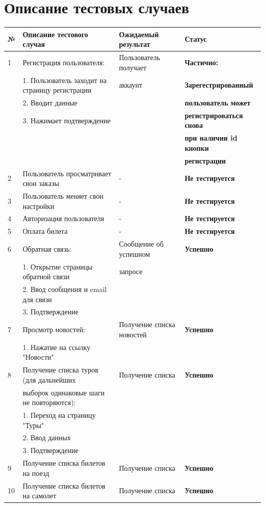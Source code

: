 ﻿\documentclass[article]{article}
\begin{document}
\section*{Описание тестовых случаев}
\begin{tabular}{l|l|l|l}
\hline
	№ & Описание тестового случая & Ожидаемый результат & Статус\\
\hline
	1 & Регистрация пользователя: & Пользователь получает  & \bf{Частично:}\\
	 & 1. Пользователь заходит на страницу регистрации & аккаунт & \bf{Зарегестрированный }\\
	 & 2. Вводит данные &  & \bf{пользователь может} \\
	 & 3. Нажимает подтверждение &  & \bf{регистрироваться снова} \\
	 &  &  & \bf{при наличии id кнопки } \\
	 & & & \bf{регистрации}\\\hline
	2 & Пользователь просматривает свои заказы & - & \bf{Не тестируется}\\
\hline
	3 & Пользователь меняет свои настройки & - & \bf{Не тестируется}\\
\hline
	4 & Авторизация пользователя & - & \bf{Не тестируется}\\
\hline
	5 & Оплата билета & - & \bf{Не тестируется}\\
\hline
	6 & Обратная связь: & Сообщение об успешном & \bf{Успешно}\\
	 & 1. Открытие страницы обратной связи & запросе & \\
	 & 2. Ввод сообщения и email для связи &  & \\
	 & 3. Подтверждение &  & \\
\hline
	7 & Просмотр новостей: & Получение списка новостей & \bf{Успешно}\\
	 & 1. Нажатие на ссылку "Новости" &  & \\
\hline
	8 & Получение списка туров (для дальнейших & Получение списка & \bf{Успешно}\\
	  & выборок одинаковые шаги не повторяются): & & \\
	  & 1. Переход на страницу "Туры" & & \\
	  & 2. Ввод данных & & \\
	  & 3. Подтверждение & & \\
\hline
	9 & Получение списка билетов на поезд & Получение списка & \bf{Успешно}\\
\hline
	10 & Получение списка билетов на самолет & Получение списка & \bf{Успешно}\\

\end{tabular}
\end{document}
